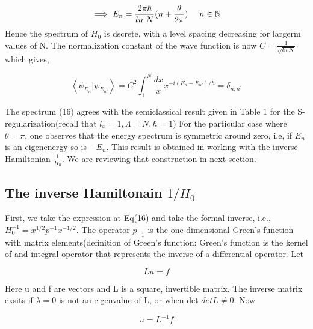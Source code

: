 \documentclass[12pt, letterpaper]{article}
\newcommand*{\1}{\hspace{1pt}}
\begin{document}
        \begin{equation}
            \implies E_{n}  = \frac{2\pi\hbar}{ln \ N}(n+\frac{\theta}{2\pi})  \ \ \ \ n \in \mathbb{N}\\
        \end{equation}
        Hence the spectrum of $H_{0}$ is dscrete, with a level spacing decreasing for largerm values of N. The normalization constant of the wave function is now 
        $C = \frac{1}{\sqrt{ln \ N}}$ which gives,

        \begin{equation}
            \left\langle\psi_{E_{n}}|\psi_{E_{n'}}\right\rangle = C^{2} \int_{1}^{N} \frac{dx}{x} x^{-i(E_{n}-E_{n'})/\hbar} = \delta_{n,n^{'}}
        \end{equation}
        
        The spectrum (16) agrees with the semiclassical result given in Table 1 for the S-regularization(recall that $l_{x} = 1, \Lambda = N, \hbar=1$)
        For the particular case where $\theta=\pi$, one observes that the energy spectrum is symmetric around zero, i.e, if $E_{n}$ is an eigenenergy so is $-E_{n}$.
        This result is obtained in working\cite{s10} with the inverse Hamiltonian $\frac{1}{H_{0}}$. We are reviewing that construction in next section.

        \subsection{The inverse Hamiltonain $1/H_{0}$}

        First, we take the expression at Eq(16) and take the formal inverse, i.e., $H_{0} ^{-1} = x^{1/2}p^{-1}x^{-1/2}$. The operator $p_{-1}$ is the one-dimensional
        Green's function with matrix elements(definition of Green's function: Green's function is the kernel of and integral operator that represents the inverse
        of a differential operator. Let 

        \begin{equation}
                Lu = f
        \end{equation}

        Here u and f are vectors and L is a square, invertible matrix. The inverse matrix exsits if $\lambda=0$ is not an eigenvalue of L, or when det $det L \neq 0$.
        Now

        \begin{equation}
            u = L^{-1}f
        \end{equation}
\end{document}
